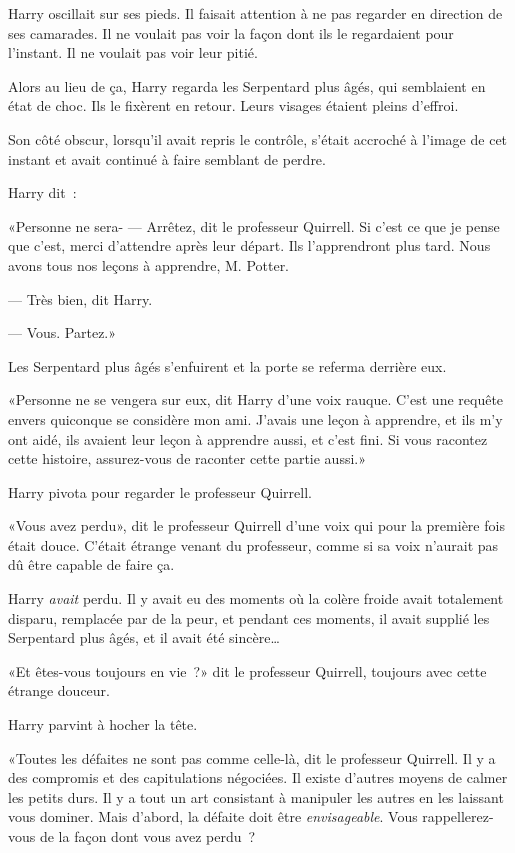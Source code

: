 Harry oscillait sur ses pieds. Il faisait attention à ne pas regarder en direction de ses camarades. Il ne voulait pas voir la façon dont ils le regardaient pour l'instant. Il ne voulait pas voir leur pitié.

Alors au lieu de ça, Harry regarda les Serpentard plus âgés, qui semblaient en état de choc. Ils le fixèrent en retour. Leurs visages étaient pleins d'effroi.

Son côté obscur, lorsqu'il avait repris le contrôle, s'était accroché à l'image de cet instant et avait continué à faire semblant de perdre.

Harry dit~:

«Personne ne sera-
--- Arrêtez, dit le professeur Quirrell. Si c'est ce que je pense que c'est, merci d'attendre après leur départ. Ils l'apprendront plus tard. Nous avons tous nos leçons à apprendre, M. Potter.

--- Très bien, dit Harry.

--- Vous. Partez.»

Les Serpentard plus âgés s'enfuirent et la porte se referma derrière eux.

«Personne ne se vengera sur eux, dit Harry d'une voix rauque. C'est une requête envers quiconque se considère mon ami. J'avais une leçon à apprendre, et ils m'y ont aidé, ils avaient leur leçon à apprendre aussi, et c'est fini. Si vous racontez cette histoire, assurez-vous de raconter cette partie aussi.»

Harry pivota pour regarder le professeur Quirrell.

«Vous avez perdu», dit le professeur Quirrell d'une voix qui pour la première fois était douce. C'était étrange venant du professeur, comme si sa voix n'aurait pas dû être capable de faire ça.

Harry \emph{avait} perdu. Il y avait eu des moments où la colère froide avait totalement disparu, remplacée par de la peur, et pendant ces moments, il avait supplié les Serpentard plus âgés, et il avait été sincère…

«Et êtes-vous toujours en vie~?» dit le professeur Quirrell, toujours avec cette étrange douceur.

Harry parvint à hocher la tête.

«Toutes les défaites ne sont pas comme celle-là, dit le professeur Quirrell. Il y a des compromis et des capitulations négociées. Il existe d'autres moyens de calmer les petits durs. Il y a tout un art consistant à manipuler les autres en les laissant vous dominer. Mais d'abord, la défaite doit être \emph{envisageable}. Vous rappellerez-vous de la façon dont vous avez perdu~?

